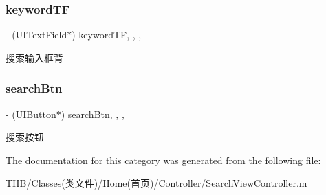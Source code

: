 \subsubsection{\texorpdfstring{keyword\+TF}{keywordTF}}
{\footnotesize\ttfamily -\/ (U\+I\+Text\+Field$\ast$) keyword\+TF\hspace{0.3cm}{\ttfamily [read]}, {\ttfamily [write]}, {\ttfamily [nonatomic]}, {\ttfamily [strong]}}

搜索输入框背 \mbox{\label{category_search_view_controller_07_08_ae2b40864eec68ff39afccd756461df4b}} 
\subsubsection{\texorpdfstring{search\+Btn}{searchBtn}}
{\footnotesize\ttfamily -\/ (U\+I\+Button$\ast$) search\+Btn\hspace{0.3cm}{\ttfamily [read]}, {\ttfamily [write]}, {\ttfamily [nonatomic]}, {\ttfamily [strong]}}

搜索按钮 

The documentation for this category was generated from the following file\+:\begin{DoxyCompactItemize}
\item 
T\+H\+B/\+Classes(类文件)/\+Home(首页)/\+Controller/Search\+View\+Controller.\+m\end{DoxyCompactItemize}
